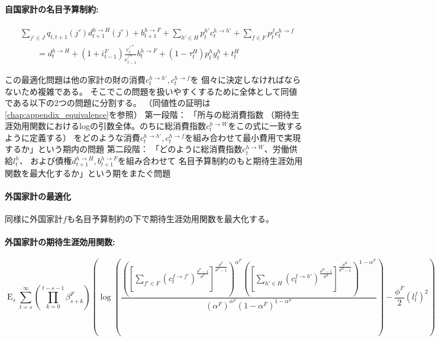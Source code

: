 \paragraph{自国家計の名目予算制約:}
\label{sec:model_households_optimization_home_budget}
\begin{equation}
\label{form:model_households_optimization_home_budget_equation}
    \begin{aligned}
        &\sum_{j'\in J}q_{t,t+1}(j')d_{t+1}^{h\to H}(j')+b_{t+1}^{h\to F}+\sum_{h'\in H}p_t^{h'}c_t^{h\to h'}+\sum_{f\in F}p_t^fc_t^{h\to f} \\
        &\qquad=d_t^{h\to H}+(1+i_{t-1}^F)\frac{e_t^{/*}}{e_{t-1}^{/*}}b_t^{h\to F}+(1-\tau_t^H)p_t^hy_t^h+t_t^H
    \end{aligned}
\end{equation}

この最適化問題は他の家計の財の消費\(c_t^{h\to h'},c_t^{h\to f}\)を
個々に決定しなければならないため複雑である。
そこでこの問題を扱いやすくするために全体として同値である以下の2つの問題に分割する。
（同値性の証明は\ref{chap:appendix_equivalence}を参照）
第一段階：
「所与の総消費指数
（期待生涯効用関数におけるlogの引数全体。のちに総消費指数\(c_t^{h\to W}\)をこの式に一致するように定義する）
をどのような消費\(c_t^{h\to h'},c_t^{h\to f}\)を組み合わせて最小費用で実現するか」という期内の問題
第二段階：
「どのように総消費指数\(c_t^{h\to W}\)、労働供給\(l_t^h\)、
および債権\(d_{t+1}^{h\to H},b_{t+1}^{h\to F}\)を組み合わせて
名目予算制約のもと期待生涯効用関数を最大化するか」という期をまたぐ問題

\paragraph{外国家計の最適化}
\label{sec:model_households_optimization_foreign}
同様に外国家計\(f\)も名目予算制約の下で期待生涯効用関数を最大化する。

\paragraph{外国家計の期待生涯効用関数:}
\label{sec:model_households_optimization_foreign_utility}
\begin{equation}
\label{form:model_households_optimization_foreign_utility_function}
    \operatorname{E}_s\sum_{t=s}^{\infty}\left(\prod_{k=0}^{t-s-1}\beta_{s+k}^F\right)\left(\log\left(\frac{\left(\left[\sum_{f'\in F}(c_t^{f\to f'})^{\frac{\theta^F-1}{\theta^F}}\right]^{\frac{\theta^F}{\theta^F-1}}\right)^{\alpha^F}\left(\left[\sum_{h'\in H}(c_t^{f\to h'})^{\frac{\theta^H-1}{\theta^H}}\right]^{\frac{\theta^H}{\theta^H-1}}\right)^{1-\alpha^F}}{(\alpha^F)^{\alpha^F}(1-\alpha^F)^{1-\alpha^F}}\right)-\frac{\phi^F}{2}(l_t^f)^2\right)
\end{equation}

